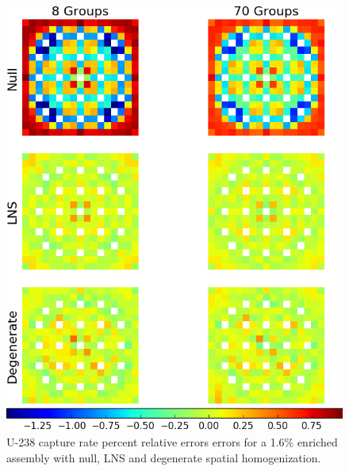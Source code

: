 \begin{figure}[ht!]
\centering
\includegraphics[width=\linewidth]{figures/patterns/lns/assm-16/capt-err}
\vspace{2mm}
\caption[U-238 capture rate errors for a 1.6\% enriched assembly]{U-238 capture rate percent relative errors errors for a 1.6\% enriched assembly with null, \ac{LNS} and degenerate spatial homogenization.}
\label{fig:chap9-assm-1.6-lns-capt-err}
\end{figure}

\clearpage

